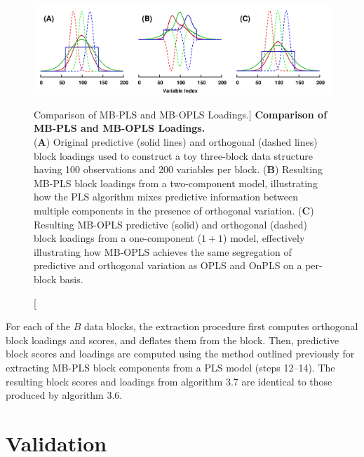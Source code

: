 \begin{figure}[ht!]
\includegraphics[width=6.5in]{figs/mva/14-mbopls.png}
\caption
      [Comparison of MB-PLS and MB-OPLS Loadings.]{
  {\bf Comparison of MB-PLS and MB-OPLS Loadings.}
  \\
  ({\bf A}) Original predictive (solid lines) and orthogonal (dashed lines)
  block loadings used to construct a toy three-block data structure having
  100 observations and 200 variables per block.
  ({\bf B}) Resulting MB-PLS block loadings from a two-component model,
  illustrating how the PLS algorithm mixes predictive information between
  multiple components in the presence of orthogonal variation.
  ({\bf C}) Resulting MB-OPLS predictive (solid) and orthogonal (dashed)
  block loadings from a one-component ($1+1$) model, effectively illustrating
  how MB-OPLS achieves the same segregation of predictive and orthogonal
  variation as OPLS and OnPLS on a per-block basis.
}
\label{figure.3.14}
\end{figure}

\begin{doublespace}
For each of the $B$ data blocks, the extraction procedure first computes
orthogonal block loadings and scores, and deflates them from the block. Then,
predictive block scores and loadings are computed using the method outlined
previously \cite{westerhuis:jchemo1998} for extracting MB-PLS block components
from a PLS model (steps 12--14). The resulting block scores and loadings from
algorithm 3.7 are identical to those produced by algorithm 3.6.
\end{doublespace}

\section{Validation}

